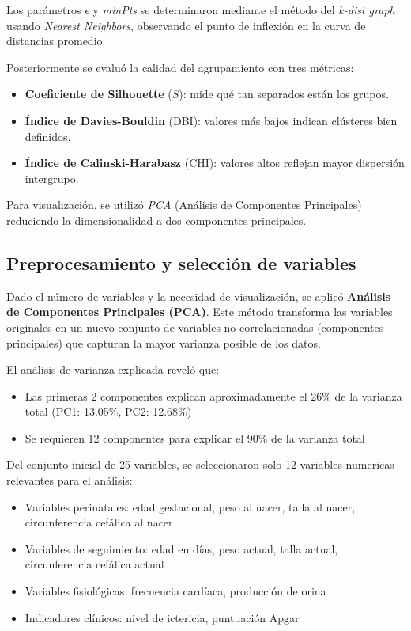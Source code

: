 \documentclass[12pt]{article}
\begin{document}
Los parámetros $\epsilon$ y \textit{minPts} se determinaron mediante el método del \emph{k-dist graph} usando \emph{Nearest Neighbors}, observando el punto de inflexión en la curva de distancias promedio.

Posteriormente se evaluó la calidad del agrupamiento con tres métricas:
\begin{itemize}
\item \textbf{Coeficiente de Silhouette} ($S$): mide qué tan separados están los grupos.
\item \textbf{Índice de Davies-Bouldin} (DBI): valores más bajos indican clústeres bien definidos.
\item \textbf{Índice de Calinski-Harabasz} (CHI): valores altos reflejan mayor dispersión intergrupo.
\end{itemize}

Para visualización, se utilizó \emph{PCA} (Análisis de Componentes Principales) reduciendo la dimensionalidad a dos componentes principales.

\subsection{Preprocesamiento y selección de variables}
Dado el número de variables y la necesidad de visualización, se aplicó \textbf{Análisis de Componentes Principales (PCA)}. Este método transforma las variables originales en un nuevo conjunto de variables no correlacionadas (componentes principales) que capturan la mayor varianza posible de los datos.

El análisis de varianza explicada reveló que:
\begin{itemize}
\item Las primeras 2 componentes explican aproximadamente el 26\% de la varianza total (PC1: 13.05\%, PC2: 12.68\%)
\item Se requieren 12 componentes para explicar el 90\% de la varianza total
\end{itemize}

Del conjunto inicial de 25 variables, se seleccionaron solo 12 variables numericas relevantes para el análisis:

\begin{itemize}
\item Variables perinatales: edad gestacional, peso al nacer, talla al nacer, circunferencia cefálica al nacer
\item Variables de seguimiento: edad en días, peso actual, talla actual, circunferencia cefálica actual
\item Variables fisiológicas: frecuencia cardíaca, producción de orina
\item Indicadores clínicos: nivel de ictericia, puntuación Apgar
\end{itemize}
\end{document}
